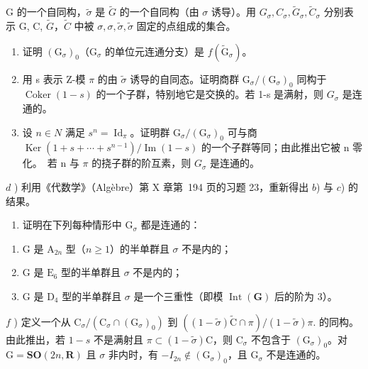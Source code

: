 \begin{enumerate}
G 的一个自同构，\(\tilde{\sigma}\) 是 \(\tilde{G}\) 的一个自同构（由 \(\sigma\) 诱导）。用 \(G_{\sigma}, C_{\sigma}, \tilde{G}_{\sigma}, \tilde{C}_{\sigma}\) 分别表示 G, C, \(\tilde{G}\)，\(\tilde{C}\) 中被 \(\sigma, \sigma, \tilde{\sigma}, \tilde{\sigma}\) 固定的点组成的集合。

\begin{enumerate}
\def\labelenumi{\alph{enumi})}
\item
  证明 \((\mathrm{G}_{\sigma})_0\)（\(\mathrm{G}_{\sigma}\) 的单位元连通分支）是 \(f(\tilde{\mathrm{G}}_{\sigma})\)。
\item
  用 s 表示 Z-模 \(\pi\) 的由 \(\tilde{\sigma}\) 诱导的自同态。证明商群 \(\mathrm{G}_{\sigma}/(\mathrm{G}_{\sigma})_{0}\) 同构于 \(\operatorname{Coker}(1-s)\) 的一个子群，特别地它是交换的。若 1-s 是满射，则 \(G_{\sigma}\) 是连通的。
\item
  设 \(n \in N\) 满足 \(s^{n} = \operatorname{Id}_{\pi}\)。证明群 \(\mathrm{G}_{\sigma}/(\mathrm{G}_{\sigma})_{0}\) 可与商 \(\operatorname{Ker}(1 + s + \cdots + s^{n-1})/\operatorname{Im}(1 - s)\) 的一个子群等同；由此推出它被 n 零化。~若 n 与 \(\pi\) 的挠子群的阶互素，则 \(G_{\sigma}\) 是连通的。
\end{enumerate}

\(d\) ) 利用《代数学》（Algèbre）第 X 章第~194 页的习题 23，重新得出 \(b\)) 与 \(c\)) 的结果。

\begin{enumerate}
\def\labelenumi{\alph{enumi})}
\setcounter{enumi}{4}
\tightlist
\item
  证明在下列每种情形中 \(\mathrm{G}_{\sigma}\) 都是连通的：
\end{enumerate}

\begin{enumerate}
\def\labelenumi{(\roman{enumi})}
\item
  G 是 \(\mathrm{A}_{2n}\) 型（\(n \geq 1\)）的半单群且 \(\sigma\) 不是内的；
\item
  G 是 \(\mathrm{E}_6\) 型的半单群且 \(\sigma\) 不是内的；
\item
  G 是 \(\mathrm{D}_4\) 型的半单群且 \(\sigma\) 是一个三重性（即模 \(\operatorname{Int}(\mathbf{G})\) 后的阶为 3）。
\end{enumerate}

\(f\) ) 定义一个从 \(\mathrm{C}_{\sigma} / (\mathrm{C}_{\sigma}\cap (\mathrm{G}_{\sigma})_{0})\) 到 \(((1 - \tilde{\sigma})\tilde{\mathrm{C}}\cap \pi) / (1 - \tilde{\sigma})\pi .\) 的同构。由此推出，若 \(1 - s\) 不是满射且 \(\pi \subset (1 - \tilde{\sigma})\mathrm{C}\)，则 \(\mathrm{C}_{\sigma}\) 不包含于 \((\mathrm{G}_{\sigma})_{0}\)。对 \(\mathrm{G} = \mathbf{SO}(2n,\mathbf{R})\) 且 \(\sigma\) 非内时，有 \(-I_{2n}\notin (\mathrm{G}_{\sigma})_{0}\)，且 \(\mathrm{G}_{\sigma}\) 不是连通的。


\end{enumerate}
